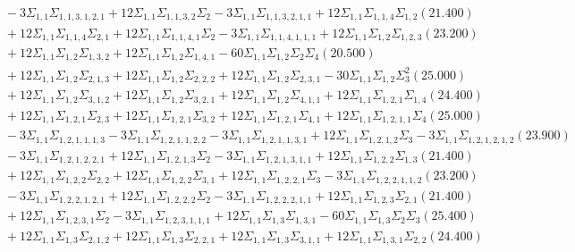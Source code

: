 \documentclass[12pt]{article}
\begin{document}
\begin{landscape}
\begin{align*}
		&\quad\quad -3\Sigma_{1,1}\Sigma_{1,1,3,1,2,1}+12\Sigma_{1,1}\Sigma_{1,1,3,2}\Sigma_{2}-3\Sigma_{1,1}\Sigma_{1,1,3,2,1,1}+12\Sigma_{1,1}\Sigma_{1,1,4}\Sigma_{1,2}(21.400) \\ 
		&\quad\quad +12\Sigma_{1,1}\Sigma_{1,1,4}\Sigma_{2,1}+12\Sigma_{1,1}\Sigma_{1,1,4,1}\Sigma_{2}-3\Sigma_{1,1}\Sigma_{1,1,4,1,1,1}+12\Sigma_{1,1}\Sigma_{1,2}\Sigma_{1,2,3}(23.200) \\ 
		&\quad\quad +12\Sigma_{1,1}\Sigma_{1,2}\Sigma_{1,3,2}+12\Sigma_{1,1}\Sigma_{1,2}\Sigma_{1,4,1}-60\Sigma_{1,1}\Sigma_{1,2}\Sigma_{2}\Sigma_{4}(20.500) \\ 
		&\quad\quad +12\Sigma_{1,1}\Sigma_{1,2}\Sigma_{2,1,3}+12\Sigma_{1,1}\Sigma_{1,2}\Sigma_{2,2,2}+12\Sigma_{1,1}\Sigma_{1,2}\Sigma_{2,3,1}-30\Sigma_{1,1}\Sigma_{1,2}\Sigma_{3}^{2}(25.000) \\ 
		&\quad\quad +12\Sigma_{1,1}\Sigma_{1,2}\Sigma_{3,1,2}+12\Sigma_{1,1}\Sigma_{1,2}\Sigma_{3,2,1}+12\Sigma_{1,1}\Sigma_{1,2}\Sigma_{4,1,1}+12\Sigma_{1,1}\Sigma_{1,2,1}\Sigma_{1,4}(24.400) \\ 
		&\quad\quad +12\Sigma_{1,1}\Sigma_{1,2,1}\Sigma_{2,3}+12\Sigma_{1,1}\Sigma_{1,2,1}\Sigma_{3,2}+12\Sigma_{1,1}\Sigma_{1,2,1}\Sigma_{4,1}+12\Sigma_{1,1}\Sigma_{1,2,1,1}\Sigma_{4}(25.000) \\ 
		&\quad\quad -3\Sigma_{1,1}\Sigma_{1,2,1,1,1,3}-3\Sigma_{1,1}\Sigma_{1,2,1,1,2,2}-3\Sigma_{1,1}\Sigma_{1,2,1,1,3,1}+12\Sigma_{1,1}\Sigma_{1,2,1,2}\Sigma_{3}-3\Sigma_{1,1}\Sigma_{1,2,1,2,1,2}(23.900) \\ 
		&\quad\quad -3\Sigma_{1,1}\Sigma_{1,2,1,2,2,1}+12\Sigma_{1,1}\Sigma_{1,2,1,3}\Sigma_{2}-3\Sigma_{1,1}\Sigma_{1,2,1,3,1,1}+12\Sigma_{1,1}\Sigma_{1,2,2}\Sigma_{1,3}(21.400) \\ 
		&\quad\quad +12\Sigma_{1,1}\Sigma_{1,2,2}\Sigma_{2,2}+12\Sigma_{1,1}\Sigma_{1,2,2}\Sigma_{3,1}+12\Sigma_{1,1}\Sigma_{1,2,2,1}\Sigma_{3}-3\Sigma_{1,1}\Sigma_{1,2,2,1,1,2}(23.200) \\ 
		&\quad\quad -3\Sigma_{1,1}\Sigma_{1,2,2,1,2,1}+12\Sigma_{1,1}\Sigma_{1,2,2,2}\Sigma_{2}-3\Sigma_{1,1}\Sigma_{1,2,2,2,1,1}+12\Sigma_{1,1}\Sigma_{1,2,3}\Sigma_{2,1}(21.400) \\ 
		&\quad\quad +12\Sigma_{1,1}\Sigma_{1,2,3,1}\Sigma_{2}-3\Sigma_{1,1}\Sigma_{1,2,3,1,1,1}+12\Sigma_{1,1}\Sigma_{1,3}\Sigma_{1,3,1}-60\Sigma_{1,1}\Sigma_{1,3}\Sigma_{2}\Sigma_{3}(25.400) \\ 
		&\quad\quad +12\Sigma_{1,1}\Sigma_{1,3}\Sigma_{2,1,2}+12\Sigma_{1,1}\Sigma_{1,3}\Sigma_{2,2,1}+12\Sigma_{1,1}\Sigma_{1,3}\Sigma_{3,1,1}+12\Sigma_{1,1}\Sigma_{1,3,1}\Sigma_{2,2}(24.400) \\ 

\end{align*}
\end{landscape}
\end{document}
